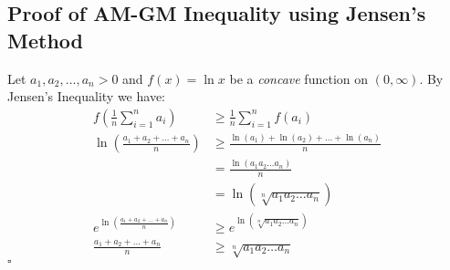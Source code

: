 \documentclass[a4paper,11pt]{article}
\begin{document}
\subsection{Proof of AM-GM Inequality using Jensen's Method}
\begin{tcolorbox}[breakable]
    Let $a_1, a_2, \dots, a_n > 0$ and $f(x) = \ln{x}$ be a \textit{concave} function on $(0, \infty)$. By Jensen's Inequality we have:
    \begin{align*}
        f \left(\frac{1}{n} \sum_{i=1}^n a_i \right) &\geq \frac{1}{n} \sum_{i=1}^n f(a_i) \\
        \ln{\left( \frac{a_1 + a_2 + \dots + a_n}{n} \right)} &\geq \frac{\ln{(a_1)} + \ln{(a_2)} + \dots + \ln{(a_n)}}{n} \\
        &= \frac{\ln{(a_1 a_2 \dots a_n)}}{n} \\
        &= \ln{(\sqrt[n]{a_1 a_2 \dots a_n})} \\
        e^{\ln{\left( \frac{a_1 + a_2 + \dots + a_n}{n} \right)}} &\geq e^{\ln{(\sqrt[n]{a_1 a_2 \dots a_n})}} \\
        \frac{a_1 + a_2 + \dots + a_n}{n} &\geq \sqrt[n]{a_1 a_2 \dots a_n}
    \end{align*}
    \hfill$\square$
\end{tcolorbox}
\end{document}
